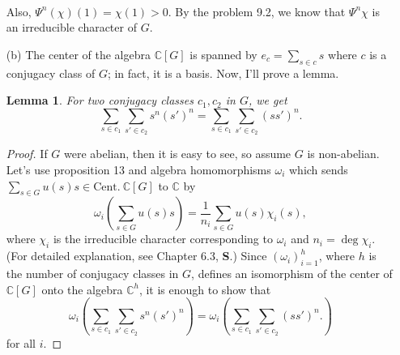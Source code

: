 \documentclass[a4paper, 12pt]{article}
\theoremstyle{Mydefinition}
\theoremstyle{Mytheorem}
\newtheorem{lemma}[statement]{Lemma}
\begin{document}
\begin{enumerate}
\begin{equation}
\begin{split}
\end{split}
\end{equation}
Also, $\Psi^n(\chi)(1)=\chi(1)>0$. By the problem 9.2, we know that $\Psi^n\chi$ is an irreducible character of $G$.
\item[(b)] The center of the algebra $\mathbb{C}[G]$ is spanned by $e_c=\sum_{s\in c}s$ where $c$ is a conjugacy class of $G$; in fact, it is a basis. Now, I'll prove a lemma.
\begin{lemma}
For two conjugacy classes $c_1,c_2$ in $G$, we get
\begin{equation}
    \sum_{s\in c_1}\sum_{s'\in c_2}s^n(s')^n = \sum_{s\in c_1}\sum_{s'\in c_2}(ss')^n.
\end{equation}
\end{lemma}
\begin{proof}
If $G$ were abelian, then it is easy to see, so assume $G$ is non-abelian. Let's use proposition 13 and algebra homomorphisms $\omega_i$ which sends $\sum_{s\in G}u(s)s\in \mathrm{Cent.}~\mathbb{C}[G]$ to $\mathbb{C}$ by
\begin{equation}
    \omega_i\left(\sum_{s\in G}u(s)s\right) = \frac{1}{n_i}\sum_{s\in G}u(s)\chi_i(s),
\end{equation}
where $\chi_i$ is the irreducible character corresponding to $\omega_i$ and $n_i=\deg \chi_i$. (For detailed explanation, see Chapter 6.3, \textbf{S}.) Since $(\omega_i)_{i=1}^h$, where $h$ is the number of conjugacy classes in $G$, defines an isomorphism of the center of $\mathbb{C}[G]$ onto the algebra $\mathbb{C}^h$, it is enough to show that 
\begin{equation}\label{HW10:Eq:11}
    \omega_i\left(\sum_{s\in c_1}\sum_{s'\in c_2}s^n(s')^n\right) = \omega_i\left(\sum_{s\in c_1}\sum_{s'\in c_2}(ss')^n.\right)
\end{equation}
for all $i$.


\end{proof}
\end{enumerate}
\end{document}
